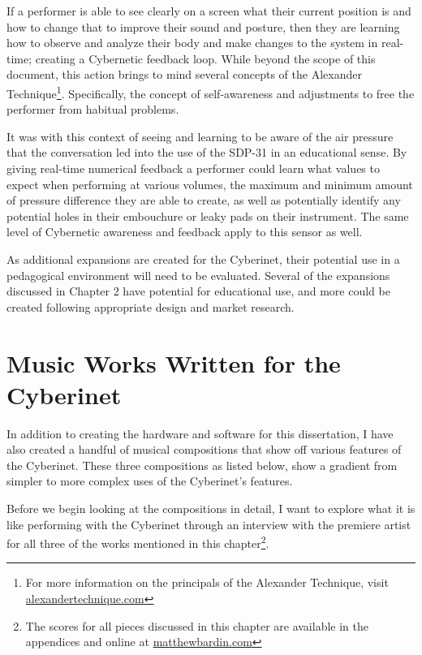 If a performer is able to see clearly on a screen what their current position is and how to change that to improve their sound and posture, then they are learning how to observe and analyze their body and make changes to the system in real-time; creating a Cybernetic feedback loop\cite{WeinerCybernetics2019}. While beyond the scope of this document, this action brings to mind several concepts of the Alexander Technique\footnote{For more information on the principals of the Alexander Technique, visit \url{alexandertechnique.com}}. Specifically, the concept of self-awareness and adjustments to free the performer from habitual problems\cite{gelbBodyLearning2013}.

It was with this context of seeing and learning to be aware of the air pressure that the conversation led into the use of the SDP-31 in an educational sense. By giving real-time numerical feedback a performer could learn what values to expect when performing at various volumes, the maximum and minimum amount of pressure difference they are able to create, as well as potentially identify any potential holes in their embouchure or leaky pads on their instrument. The same level of Cybernetic awareness and feedback apply to this sensor as well.

As additional expansions are created for the Cyberinet, their potential use in a pedagogical environment will need to be evaluated. Several of the expansions discussed in Chapter 2 have potential for educational use, and more could be created following appropriate design and market research.

\chapter{Music Works Written for the Cyberinet}

In addition to creating the hardware and software for this dissertation, I have also created a handful of musical compositions that show off various features of the Cyberinet. These three compositions as listed below, show a gradient from simpler to more complex uses of the Cyberinet’s features.

Before we begin looking at the compositions in detail, I want to explore what it is like performing with the Cyberinet through an interview with the premiere artist for all three of the works mentioned in this chapter\footnote{The scores for all pieces discussed in this chapter are available in the appendices and online at \url{matthewbardin.com}}.


